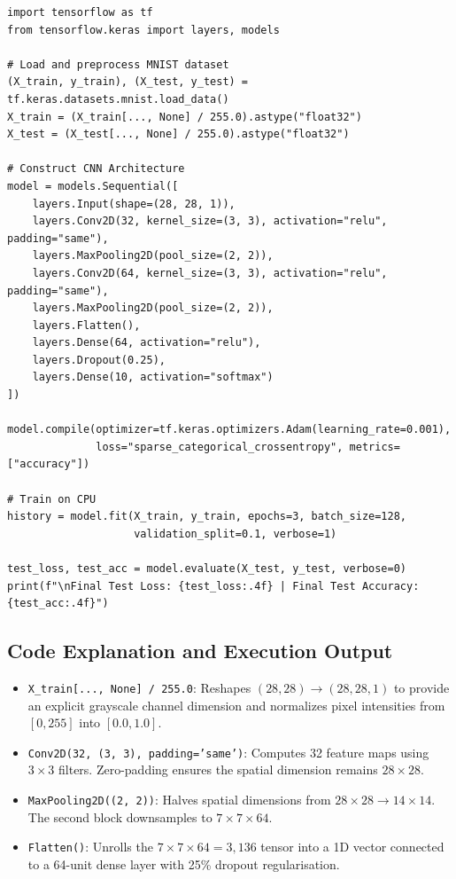 \documentclass[12pt,a4paper]{article}
\begin{document}
\begin{lstlisting}
import tensorflow as tf
from tensorflow.keras import layers, models

# Load and preprocess MNIST dataset
(X_train, y_train), (X_test, y_test) = tf.keras.datasets.mnist.load_data()
X_train = (X_train[..., None] / 255.0).astype("float32")
X_test = (X_test[..., None] / 255.0).astype("float32")

# Construct CNN Architecture
model = models.Sequential([
    layers.Input(shape=(28, 28, 1)),
    layers.Conv2D(32, kernel_size=(3, 3), activation="relu", padding="same"),
    layers.MaxPooling2D(pool_size=(2, 2)),
    layers.Conv2D(64, kernel_size=(3, 3), activation="relu", padding="same"),
    layers.MaxPooling2D(pool_size=(2, 2)),
    layers.Flatten(),
    layers.Dense(64, activation="relu"),
    layers.Dropout(0.25),
    layers.Dense(10, activation="softmax")
])

model.compile(optimizer=tf.keras.optimizers.Adam(learning_rate=0.001),
              loss="sparse_categorical_crossentropy", metrics=["accuracy"])

# Train on CPU
history = model.fit(X_train, y_train, epochs=3, batch_size=128,
                    validation_split=0.1, verbose=1)

test_loss, test_acc = model.evaluate(X_test, y_test, verbose=0)
print(f"\nFinal Test Loss: {test_loss:.4f} | Final Test Accuracy: {test_acc:.4f}")
\end{lstlisting}

\subsection{Code Explanation and Execution Output}
\begin{itemize}[leftmargin=*]
\item \texttt{X\_train[..., None] / 255.0}: Reshapes $(28, 28) \to (28, 28, 1)$ to provide an explicit grayscale channel dimension and normalizes pixel intensities from $[0, 255]$ into $[0.0, 1.0]$.
\item \texttt{Conv2D(32, (3, 3), padding='same')}: Computes 32 feature maps using $3 \times 3$ filters. Zero-padding ensures the spatial dimension remains $28 \times 28$.
\item \texttt{MaxPooling2D((2, 2))}: Halves spatial dimensions from $28 \times 28 \to 14 \times 14$. The second block downsamples to $7 \times 7 \times 64$.
\item \texttt{Flatten()}: Unrolls the $7 \times 7 \times 64 = 3,136$ tensor into a 1D vector connected to a 64-unit dense layer with 25\% dropout regularisation.
\end{itemize}
\end{document}
